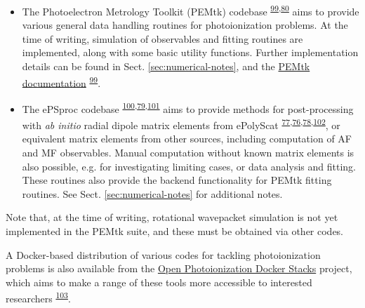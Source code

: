 \documentclass[10pt]{article}
\begin{document}
\begin{itemize}
\item The Photoelectron Metrology Toolkit (PEMtk) codebase \textsuperscript{\hyperref[csl:99]{99},\hyperref[csl:80]{80}} aims to provide various general data handling routines for photoionization problems. At the time of writing, simulation of observables and fitting routines are implemented, along with some basic utility functions. Further implementation details can be found in Sect. \ref{sec:numerical-notes}, and the \href{https://pemtk.readthedocs.io/en/latest/about.html}{PEMtk documentation} \textsuperscript{\hyperref[csl:99]{99}}.
\item The ePSproc codebase \textsuperscript{\hyperref[csl:100]{100},\hyperref[csl:79]{79},\hyperref[csl:101]{101}} aims to provide methods for post-processing with \textit{ab initio} radial dipole matrix elements from ePolyScat \textsuperscript{\hyperref[csl:77]{77},\hyperref[csl:76]{76},\hyperref[csl:78]{78},\hyperref[csl:102]{102}}, or equivalent matrix elements from other sources, including computation of AF and MF observables. Manual computation without known matrix elements is also possible, e.g. for investigating limiting cases, or data analysis and fitting. These routines also provide the backend functionality for PEMtk fitting routines. See Sect. \ref{sec:numerical-notes} for additional notes.
\end{itemize}

Note that, at the time of writing, rotational wavepacket simulation is not yet implemented in the PEMtk suite, and these must be obtained via other codes. %

A Docker-based distribution of various codes for tackling photoionization problems is also available from the \href{https://github.com/phockett/open-photoionization-docker-stacks}{Open Photoionization Docker Stacks} project, which aims to make a range of these tools more accessible to interested researchers \textsuperscript{\hyperref[csl:103]{103}}.







\end{document}
